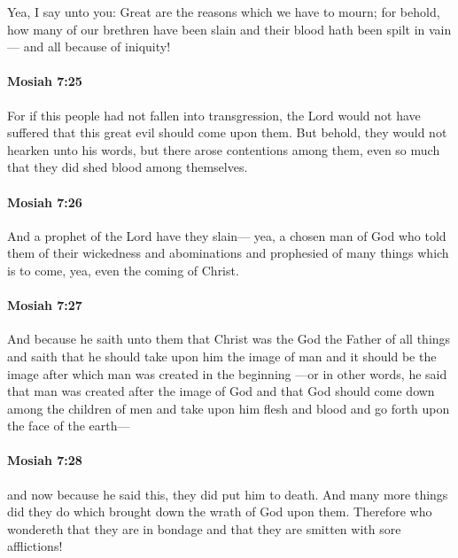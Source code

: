 			Yea, I say unto you:
			Great are the reasons which we have to mourn;
			for behold, how many of our brethren have been slain
			and their blood hath been spilt in vain---
			and all because of iniquity!

		\paragraph{Mosiah 7:25} %
			\label{MOSIAH-7-25}

			For if this people had not fallen into transgression,
			the Lord would not have suffered that this great evil should come upon them.
			But behold, they would not hearken unto his words,
			but there arose contentions among them,
			even so much that they did shed blood among themselves.

		\paragraph{Mosiah 7:26} %
			\label{MOSIAH-7-26}

			And a prophet of the Lord have they slain---
			yea, a chosen man of God who told them of their wickedness and abominations
			and prophesied of many things which is to come,
			yea, even the coming of Christ.

		\paragraph{Mosiah 7:27} %
			\label{MOSIAH-7-27}

			And because he saith unto them that Christ was the God the Father of all things
			and saith that he should take upon him the image of man
			and it should be the image after which man was created in the beginning
			---or in other words, he said that man was created after the image of God
			and that God should come down among the children of men
			and take upon him flesh and blood
			and go forth upon the face of the earth---

		\paragraph{Mosiah 7:28} %
			\label{MOSIAH-7-28}

			and now because he said this, they did put him to death.
			And many more things did they do
			which brought down the wrath of God upon them.
			Therefore who wondereth that they are in bondage
			and that they are smitten with sore afflictions!


